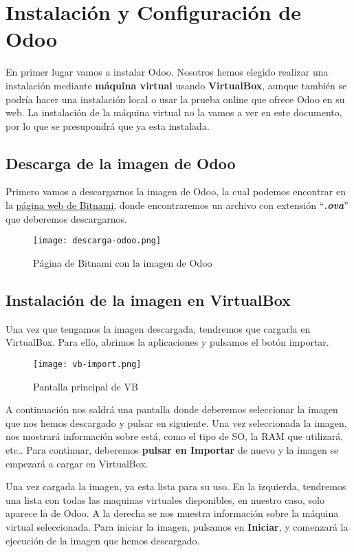 \section{Instalación y Configuración de  Odoo}
En primer lugar vamos a instalar Odoo. Nosotros hemos elegido realizar una instalación mediante \textbf{máquina virtual} usando \textbf{VirtualBox}, aunque también se podría hacer una instalación local o usar la prueba online que ofrece Odoo en su web. La instalación de la máquina virtual no la vamos a ver en este documento, por lo que se presupondrá que ya esta instalada.

\subsection{Descarga de la imagen de Odoo}
Primero vamos a descargarnos la imagen de Odoo, la cual podemos encontrar en la \href{https://bitnami.com/stack/odoo/virtual-machine}{página web de Bitnami}, donde encontraremos un archivo con extensión ``\textbf{\textit{.ova}}'' que deberemos descargarnos.

\begin{figure}[ht]
    \centering
    \texttt{[image: descarga-odoo.png]}
    \caption{Página de Bitnami con la imagen de Odoo}
\end{figure}


\subsection{Instalación de la imagen en VirtualBox}
Una vez que tengamos la imagen descargada, tendremos que cargarla en VirtualBox. Para ello, abrimos la aplicaciones y pulsamos el botón importar.

\begin{figure}[ht]
    \centering
    \texttt{[image: vb-import.png]}
    \caption{Pantalla principal de VB}
\end{figure}

A continuación nos saldrá una pantalla donde deberemos seleccionar la imagen que nos hemos descargado y pulsar en siguiente. Una vez seleccionada la imagen, nos mostrará información sobre está, como el tipo de SO, la RAM que utilizará, etc.. Para continuar, deberemos \textbf{pulsar en Importar} de nuevo y la imagen se empezará a cargar en VirtualBox.

Una vez cargada la imagen, ya esta lista para su uso. En la izquierda, tendremos una lista con todas las maquinas virtuales disponibles, en nuestro caso, solo aparece la de Odoo. A la derecha se nos muestra información sobre la máquina virtual seleccionada. Para iniciar la imagen, pulsamos en \textbf{Iniciar}, y comenzará la ejecución de la imagen que hemos descargado.

